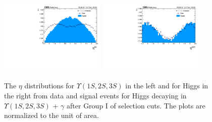 \begin{figure}[!htbp]
\begin{center}
\includegraphics[width=0.45\textwidth]{figures_and_tables/outputPlots/HtoUpsilon_Cat0_ZZZZZ/au/data_x_mc/noKinCuts/h_noKin_Upsilon_eta}\hspace*{1.cm}
\includegraphics[width=0.45\textwidth]{figures_and_tables/outputPlots/HtoUpsilon_Cat0_ZZZZZ/au/data_x_mc/noKinCuts/h_noKin_Z_eta}
\end{center}\vspace*{-.5cm}
\caption{The $\eta$ distributions for $\Upsilon(1S,2S,3S)$ in the left and for Higgs in the right from data and signal events for Higgs decaying in $\Upsilon(1S,2S,3S)$ + $\gamma$ after Group I of selection cuts. The plots are normalized to the unit of area.}
\label{fig:etaUpsilon_and_Higgs_HtoUpsilon_Cat0}
\end{figure}


